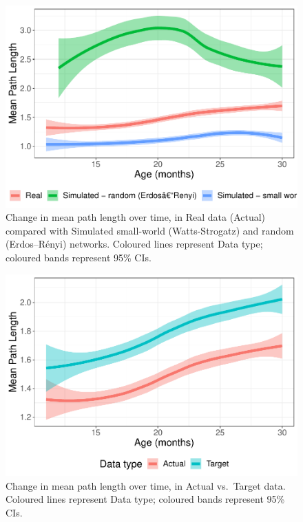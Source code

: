 \documentclass[
  man,floatsintext]{apa6}
\begin{document}
\begin{figure}
\centering
\includegraphics{NetworkGraphs_supplementary-data_files/figure-latex/Figure-path-length-age-1.pdf}
\caption{\label{fig:Figure-path-length-age}Change in mean path length over time, in Real data (Actual) compared with Simulated small-world (Watts-Strogatz) and random (Erdos--Rényi) networks. Coloured lines represent Data type; coloured bands represent 95\% CIs.}
\end{figure}

\begin{figure}
\centering
\includegraphics{NetworkGraphs_supplementary-data_files/figure-latex/Figure-path-length-DT-age-1.pdf}
\caption{\label{fig:Figure-path-length-DT-age}Change in mean path length over time, in Actual vs.~Target data. Coloured lines represent Data type; coloured bands represent 95\% CIs.}
\end{figure}
\end{document}
